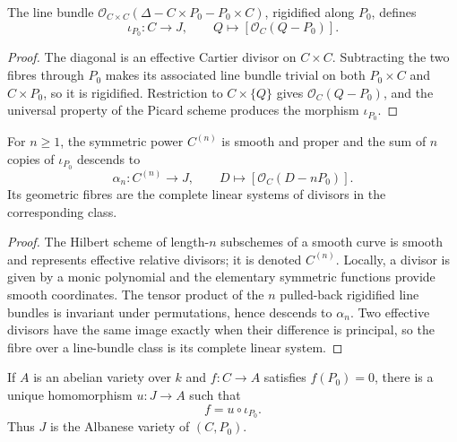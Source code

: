 \begin{definition}
  \label{mk-def-abel-jacobi}
  \cite{milne-av,mumford-av}
  The line bundle
  \(\mathcal O_{C\times C}(\Delta-C\times P_0-P_0\times C)\), rigidified
  along \(P_0\), defines
  \[
    \iota_{P_0}:C\longrightarrow J,\qquad
    Q\longmapsto[\mathcal O_C(Q-P_0)].
  \]
\end{definition}

\begin{proof}
  The diagonal is an effective Cartier divisor on \(C\times C\).  Subtracting
  the two fibres through \(P_0\) makes its associated line bundle trivial on
  both \(P_0\times C\) and \(C\times P_0\), so it is rigidified.  Restriction
  to \(C\times\{Q\}\) gives \(\mathcal O_C(Q-P_0)\), and the universal
  property of the Picard scheme produces the morphism \(\iota_{P_0}\).
\end{proof}

\begin{theorem}
  \label{mk-thm-symmetric-powers}
  \cite{milne-av}
  For \(n\ge1\), the symmetric power \(C^{(n)}\) is smooth and proper and the
  sum of \(n\) copies of \(\iota_{P_0}\) descends to
  \[
    \alpha_n:C^{(n)}\longrightarrow J,\qquad
    D\longmapsto[\mathcal O_C(D-nP_0)].
  \]
  Its geometric fibres are the complete linear systems of divisors in the
  corresponding class.
\end{theorem}

\begin{proof}
  The Hilbert scheme of length-\(n\) subschemes of a smooth curve is smooth
  and represents effective relative divisors; it is denoted \(C^{(n)}\).
  Locally, a divisor is given by a monic polynomial and the elementary
  symmetric functions provide smooth coordinates.  The tensor product of the
  \(n\) pulled-back rigidified line bundles is invariant under permutations,
  hence descends to \(\alpha_n\).  Two effective divisors have the same image
  exactly when their difference is principal, so the fibre over a line-bundle
  class is its complete linear system.
\end{proof}

\begin{theorem}
  \label{mk-thm-abel-jacobi-universal}
  \cite{milne-av}
  If \(A\) is an abelian variety over \(k\) and \(f:C\to A\) satisfies
  \(f(P_0)=0\), there is a unique homomorphism \(u:J\to A\) such that
  \[
    f=u\circ\iota_{P_0}.
  \]
  Thus \(J\) is the Albanese variety of \((C,P_0)\).
\end{theorem}

